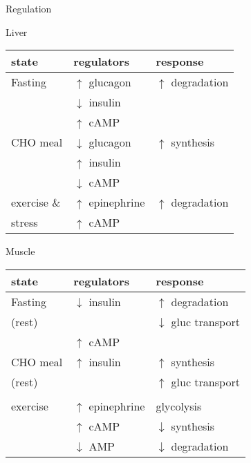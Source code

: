 \documentclass[presentation, smaller]{beamer}
\begin{document}
\begin{frame}[label={sec:orgaf11009}]{Regulation}
\begin{block}{Liver}
\begin{center}
\begin{tabular}{lll}
state & regulators & response\\
\hline
Fasting & \(\uparrow\) glucagon & \(\uparrow\) degradation\\
 & \(\downarrow\) insulin & \\
 & \(\uparrow\) cAMP & \\
CHO meal & \(\downarrow\) glucagon & \(\uparrow\) synthesis\\
 & \(\uparrow\) insulin & \\
 & \(\downarrow\) cAMP & \\
exercise \& & \(\uparrow\) epinephrine & \(\uparrow\) degradation\\
stress & \(\uparrow\) cAMP & \\
\end{tabular}
\end{center}
\end{block}


\begin{block}{Muscle}
\begin{center}
\begin{tabular}{lll}
state & regulators & response\\
\hline
Fasting & \(\downarrow\) insulin & \(\uparrow\) degradation\\
(rest) &  & \(\downarrow\) gluc transport\\
 & \(\uparrow\) cAMP & \\
CHO meal & \(\uparrow\) insulin & \(\uparrow\) synthesis\\
(rest) &  & \(\uparrow\) gluc transport\\
 &  & \\
exercise & \(\uparrow\) epinephrine & glycolysis\\
 & \(\uparrow\) cAMP & \(\downarrow\) synthesis\\
 & \(\downarrow\) AMP & \(\downarrow\) degradation\\
\end{tabular}
\end{center}
\end{block}
\end{frame}
\end{document}
